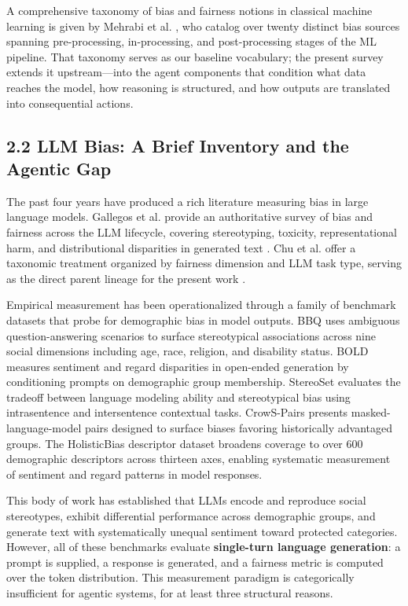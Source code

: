 \documentclass[sigconf,nonacm]{acmart}
\begin{document}
A comprehensive taxonomy of bias and fairness notions in classical machine learning is given by Mehrabi et al. \cite{mehrabi2021survey}, who catalog over twenty distinct bias sources spanning pre-processing, in-processing, and post-processing stages of the ML pipeline. That taxonomy serves as our baseline vocabulary; the present survey extends it upstream—into the agent components that condition what data reaches the model, how reasoning is structured, and how outputs are translated into consequential actions.

\subsection{2.2 LLM Bias: A Brief Inventory and the Agentic Gap}

The past four years have produced a rich literature measuring bias in large language models. Gallegos et al. provide an authoritative survey of bias and fairness across the LLM lifecycle, covering stereotyping, toxicity, representational harm, and distributional disparities in generated text \cite{gallegos2024bias}. Chu et al. offer a taxonomic treatment organized by fairness dimension and LLM task type, serving as the direct parent lineage for the present work \cite{chu2024fairness}.

Empirical measurement has been operationalized through a family of benchmark datasets that probe for demographic bias in model outputs. BBQ \cite{parrish2022bbq} uses ambiguous question-answering scenarios to surface stereotypical associations across nine social dimensions including age, race, religion, and disability status. BOLD \cite{dhamala2021bold} measures sentiment and regard disparities in open-ended generation by conditioning prompts on demographic group membership. StereoSet \cite{nadeem2021stereoset} evaluates the tradeoff between language modeling ability and stereotypical bias using intrasentence and intersentence contextual tasks. CrowS-Pairs \cite{nangia2020crows} presents masked-language-model pairs designed to surface biases favoring historically advantaged groups. The HolisticBias descriptor dataset \cite{smith2022sorry} broadens coverage to over 600 demographic descriptors across thirteen axes, enabling systematic measurement of sentiment and regard patterns in model responses.

This body of work has established that LLMs encode and reproduce social stereotypes, exhibit differential performance across demographic groups, and generate text with systematically unequal sentiment toward protected categories. However, all of these benchmarks evaluate \textbf{single-turn language generation}: a prompt is supplied, a response is generated, and a fairness metric is computed over the token distribution. This measurement paradigm is categorically insufficient for agentic systems, for at least three structural reasons.
\end{document}
